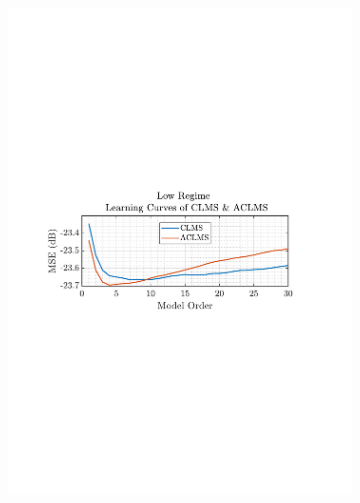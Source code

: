 \documentclass[12pt]{article}
\begin{document}
\begin{figure}[H]
\begin{subfigure}{0.49\textwidth}
					\includegraphics[trim={2.2cm 11.2cm 3.15cm  11.2cm}, clip, width=\textwidth]{../MATLAB/figures/q3_1b_fig05.pdf} 
				\end{subfigure}
				\begin{subfigure}{0.49\textwidth}
					\centering

\end{subfigure}
\end{figure}
\end{document}
